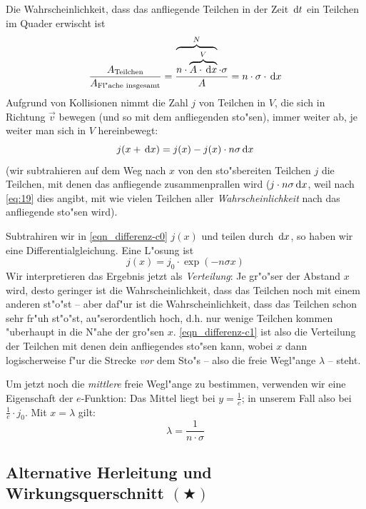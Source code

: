 Die Wahrscheinlichkeit, dass das anfliegende Teilchen in der Zeit
$\, \mathrm{d} t$ ein Teilchen im Quader erwischt ist
\begin{equation}
   \label{eq:19}
   \frac{A_\text{Teilchen}}{A_\text{Fl"ache insgesamt}} =
   \frac{\overbrace{n \cdot \overbrace{A \cdot \, \mathrm{d} x}^V}^N \cdot
     \sigma}{A}
= n \cdot \sigma \cdot \, \mathrm{d} x
\end{equation}
Aufgrund von Kollisionen nimmt die Zahl $j$ von Teilchen in $V$, die sich in
Richtung $\vec v$ bewegen (und so mit dem anfliegenden sto"sen), immer
weiter ab, je weiter man sich in $V$ hereinbewegt:
\begin{equation}
   \label{eqn_differenz-c0}
   j(x + \, \mathrm{d} x) = j(x) - j(x) \cdot n \sigma \, \mathrm{d} x
\end{equation}
(wir subtrahieren auf dem Weg nach $x$ von den sto"sbereiten Teilchen
$j$ die Teilchen, mit denen das anfliegende zusammenprallen wird ($j
\cdot n\sigma \, \mathrm{d} x$, weil nach \eqref{eq:19} dies angibt, mit wie
vielen Teilchen aller
\emph{Wahrscheinlichkeit} nach das anfliegende sto"sen wird). 

Subtrahiren wir in \eqref{eqn_differenz-c0} $j(x)$ und teilen durch $\, \mathrm{d} x$, so
haben wir eine Differentialgleichung. Eine L"osung ist
\begin{equation}
   \label{eqn_differenz-c1}
   j(x) = j_0 \cdot \exp ( - n \sigma x )
\end{equation}
Wir interpretieren das Ergebnis jetzt als \emph{Verteilung}: Je gr"o"ser
der Abstand $x$ wird, desto geringer ist die Wahrscheinlichkeit, dass
das Teilchen noch mit einem anderen st"o"st -- aber daf"ur ist die
Wahrscheinlichkeit, dass das Teilchen schon sehr fr"uh st"o"st,
au"serordentlich hoch, d.h. nur wenige Teilchen kommen "uberhaupt in die
N"ahe der gro"sen $x$. \eqref{eqn_differenz-c1} ist also die Verteilung der
Teilchen mit denen dein anfliegendes sto"sen kann, wobei $x$ dann
logischerweise f"ur die Strecke \emph{vor} dem Sto"s -- also die freie
Wegl"ange $\lambda$ -- steht.

Um jetzt noch die \emph{mittlere} freie Wegl"ange zu bestimmen,
verwenden wir eine Eigenschaft der $e$-Funktion: Das Mittel liegt bei
$y = \frac{1}{e}$; in unserem Fall also bei $\frac{1}{e} \cdot
j_0$. Mit $x = \lambda$ gilt:
\begin{equation}
   \label{eqn_differenz-c2}
   \boxed{
\lambda = \frac{1}{n \cdot \sigma}
}
\end{equation}



\subsection{Alternative Herleitung und Wirkungsquerschnitt $(\bigstar)$}
\label{kap_altern-herl-und-wirk-bigst}


